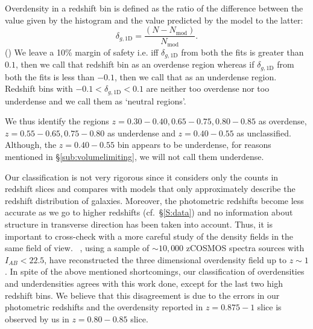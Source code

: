 \documentclass[twocolumn,useAMS,usenatbib]{mn2e}
\newcommand{\rachel}[1]{}
\begin{document}
Overdensity in a redshift bin is defined as the ratio of the
difference between the value given by the histogram and the value
predicted by the model to the latter:
\begin{equation}
\delta_{g,\text{1D}}=\frac{(N-N_{\text{mod}})}{N_{\text{mod}}}.  
\end{equation}
(\rachel{Call it $\delta_{g,\text{1D}}$, not $\delta$, which implies matter
  overdensity.  Better yet would be $\delta_{g,1D}$, to clearly
  indicate this is based on a 1-dimensional slice through redshift
  space rather than isolating 3D overdensities.})
We leave a 10\% margin of safety i.e. iff $\delta_{g,\text{1D}}$ from both the fits is greater than $0.1$, then we call that redshift bin as an
overdense region whereas if $\delta_{g,\text{1D}}$ from both the fits is less than $-0.1$, then we call that as an underdense region. Redshift bins with $-0.1 < \delta_{g,\text{1D}} < 0.1$ are neither too overdense
nor too underdense and we call them as `neutral regions'.


We thus identify the regions $z=0.30-0.40, 0.65-0.75, 0.80-0.85$ as overdense, $z=0.55-0.65, 0.75-0.80$ as underdense and $z=0.40-0.55$ as unclassified. Although, the $z=0.40-0.55$ bin
appears to be underdense, for reasons mentioned in \S\ref{sub:volumelimiting}, we will not call them underdense.

Our classification is not very rigorous since it considers only the counts in redshift slices and compares with models that only approximately describe the redshift distribution of galaxies.
Moreover, the photometric redshifts become less accurate as we go to higher redshifts (cf.~\S\ref{S:data}) and no information about structure in transverse direction has been taken into account.
Thus, it is important to cross-check with a more careful study of the density fields in the same field of view.
~\cite{Kovac_Density10k}, using a sample of $\sim 10,000$ zCOSMOS spectra sources with $I_{AB}<22.5$, have reconstructed the three dimensional overdensity field up to $z\sim 1$.
In spite of the above mentioned shortcomings, our classification of overdensities and underdensities agrees with this work done, except for the last two high redshift bins.
We believe that this disagreement is due to the errors in our photometric redshifts and the overdensity reported in $z=0.875-1$ slice
is observed by us in $z=0.80-0.85$ slice.
\end{document}
